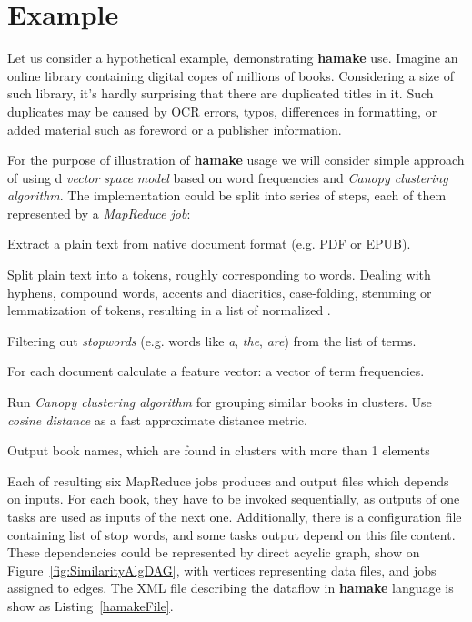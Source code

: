 \documentclass[10pt,conference,letterpaper]{IEEEtran}
\begin{document}
\section{Example}

Let us consider a hypothetical example, demonstrating \textbf{hamake}
use. Imagine an online library containing digital copes of millions of
books. Considering a size of such library, it's hardly surprising that
there are duplicated titles in it. Such duplicates may be caused by
OCR errors, typos, differences in formatting, or added material such
as foreword or a publisher information.

For the purpose of illustration of \textbf{hamake} usage we will
consider simple approach of using d \textit{vector space
  model}\cite{manning2008introduction} based on word frequencies and
\textit{Canopy clustering algorithm}\cite{efficientClustering}. The
implementation could be split into series of steps, each of them
represented by a \textit{MapReduce job}:

\begin{description}
\item[\emph{ExtractText}] Extract a plain text from native document format
  (e.g. PDF or EPUB).
\item[\emph{Tokenize}] Split plain text into a tokens, roughly
  corresponding to words. Dealing with hyphens, compound words,
  accents and diacritics, case-folding, stemming or lemmatization of
  tokens, resulting in a list of normalized .
\item[\emph{FilterStopwords}] Filtering out \textit{stopwords} (e.g. words
  like \textit{a}, \textit{the}, \textit{are}) from the list of
  terms.
\item[\emph{CalculateTF}] For each document calculate a feature
  vector: a vector of term frequencies.
\item[\emph{FindSimilar}] Run \textit{Canopy clustering algorithm}
  for grouping similar books in clusters. Use
  \textit{cosine distance} as a fast approximate distance metric. 
\item[\emph{OutputResult}] Output book names, which are found in
  clusters with more than 1 elements
\end{description}

Each of resulting six MapReduce jobs produces and output files which
depends on inputs. For each book, they have to be invoked
sequentially, as outputs of one tasks are used as inputs of the next
one. Additionally, there is a configuration file containing list of
stop words, and some tasks output depend on this file content. These
dependencies could be represented by direct acyclic graph, show on
Figure~\ref{fig:SimilarityAlgDAG}, with vertices representing data
files, and jobs assigned to edges. The XML file describing the
dataflow in \textbf{hamake} language is show as
Listing~\ref{hamakeFile}.
\end{document}
